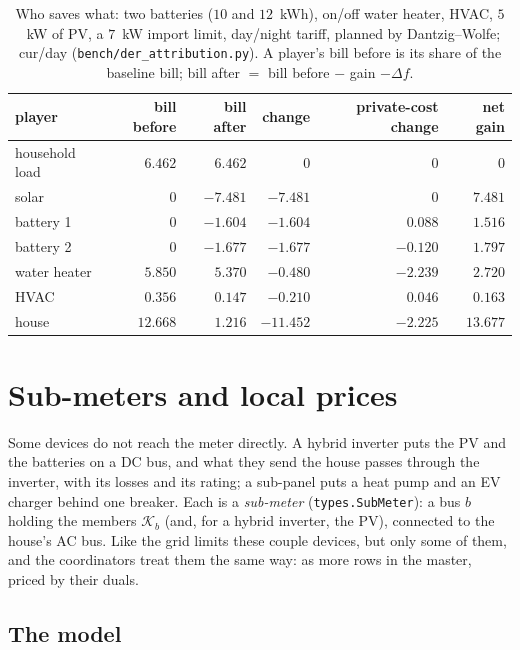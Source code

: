\documentclass[11pt,a4paper]{article}
\begin{document}
\begin{table}[htbp]
\centering
\small
\begin{tabular}{lrrrrr}
\toprule
player & bill before & bill after & change & private-cost change & net gain \\
\midrule
household load & $6.462$ & $6.462$ & $0$ & $0$ & $0$ \\
solar          & $0$ & $-7.481$ & $-7.481$ & $0$ & $7.481$ \\
battery 1      & $0$ & $-1.604$ & $-1.604$ & $0.088$ & $1.516$ \\
battery 2      & $0$ & $-1.677$ & $-1.677$ & $-0.120$ & $1.797$ \\
water heater   & $5.850$ & $5.370$ & $-0.480$ & $-2.239$ & $2.720$ \\
HVAC           & $0.356$ & $0.147$ & $-0.210$ & $0.046$ & $0.163$ \\
\midrule
house          & $12.668$ & $1.216$ & $-11.452$ & $-2.225$ & $13.677$ \\
\bottomrule
\end{tabular}
\caption{Who saves what: two batteries ($10$ and $12$~kWh), on/off water heater,
HVAC, $5$~kW of PV, a $7$~kW import limit, day/night tariff, planned by
Dantzig--Wolfe; cur/day (\texttt{bench/der\_attribution.py}). A player's bill
before is its share of the baseline bill; bill after $=$ bill before $-$ gain
$- \Delta f$.}
\label{tab:ledger}
\end{table}

\section{Sub-meters and local prices}
\label{sec:submeters}

Some devices do not reach the meter directly. A hybrid inverter puts the PV and
the batteries on a DC bus, and what they send the house passes through the
inverter, with its losses and its rating; a sub-panel puts a heat pump and an EV
charger behind one breaker. Each is a \emph{sub-meter}
(\texttt{types.SubMeter}): a bus $b$ holding the members $\mathcal K_b$ (and, for
a hybrid inverter, the PV), connected to the house's AC bus. Like the grid limits
these couple devices, but only some of them, and the coordinators treat them the
same way: as more rows in the master, priced by their duals.

\subsection{The model}
\end{document}
